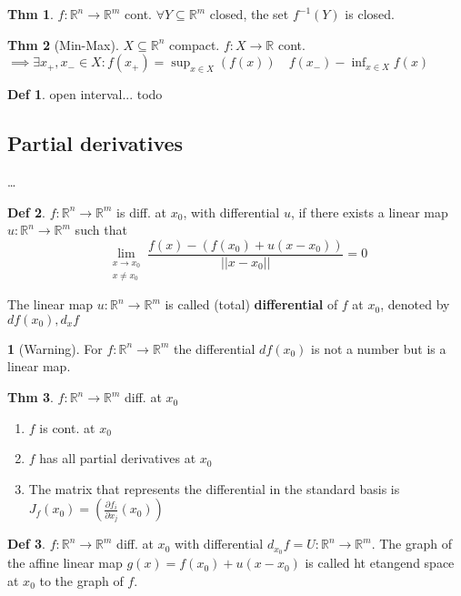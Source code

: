 \documentclass[a4paper, 10pt]{article}
\theoremstyle{definition}
\newtheorem*{theorem}{Thm}
\newtheorem*{definition}{Def}
\theoremstyle{colored}
\newtheorem*{note_wrapper}{}
\theoremstyle{ex}
\theoremstyle{named}
\newenvironment{note}%
    {\begin{mdframed}[style=trick]\begin{note_wrapper}}%
    {\end{note_wrapper}\end{mdframed}}
\newcommand{\R}{\mathbb{R}}
\begin{document}
\begin{theorem}
    \(f: \R^n \to \R^m\) cont. \(\forall Y \subseteq \R^m\) closed, the set \(f^{-1}(Y)\) is closed.
\end{theorem}

\begin{theorem}[Min-Max]
    \(X \subseteq \R^n\) compact. \(f: X \to \R\) cont. \(\implies \exists x_+, x_- \in X: f(x_+) = \sup_{x \in X}(f(x)) \quad f(x_-) - \inf_{x \in X} f(x)\)
\end{theorem}

\begin{definition}
    open interval... todo
\end{definition}

\subsection{Partial derivatives}
\ldots

\begin{definition}
    \(f: \R^n \to \R^m\) is diff. at \(x_0\), with differential \(u\), if there exists a linear map \(u: \R^n \to \R^m\) such that
    \[\lim_{\substack{x \to x_0 \\ x \neq x_0}} \frac{f(x) - (f(x_0) + u(x - x_0))}{||x-x_0||} = 0\]

    The linear map \(u: \R^n \to \R^m\) is called (total) \textbf{differential} of \(f\) at \(x_0\), denoted by \(df(x_0), d_xf\)
\end{definition}

\begin{note}[Warning]
    For \(f: \R^n \to \R^m\) the differential \(df(x_0)\) is not a number but is a linear map. 
\end{note}

\begin{theorem}
    \(f: \R^n \to \R^m\) diff. at \(x_0\)
    \begin{enumerate}
        \item \(f\) is cont. at \(x_0\)
        \item \(f\) has all partial derivatives at \(x_0\)
        \item The matrix that represents the differential in the standard basis is \(J_f(x_0) = \left(\frac{\partial f_i}{\partial x_j} (x_0)\right)\)
    \end{enumerate}
\end{theorem}

\begin{definition}
    \(f: \R^n \to \R^m\) diff. at \(x_0\) with differential \(d_{x_0}f = U: \R^n \to \R^m\). The graph of the affine linear map \(g(x) = f(x_0) + u(x - x_0)\) is called ht etangend space at \(x_0\) to the graph of \(f\).
\end{definition}
\end{document}
